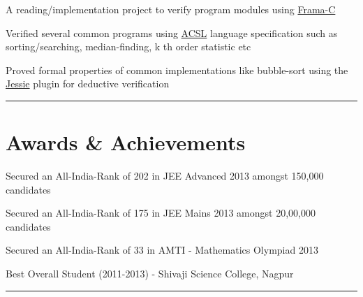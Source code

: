 \documentclass[letterpaper]{Formatting}
\begin{document}
\begin{minipage}[t]{0.66\textwidth}
A reading/implementation project to verify program modules using \href{http://frama-c.com/}{Frama-C}
\vspace{\topsep}
\footnotesize{
\begin{tightitemize}
\item Verified several common programs using \href{frama-c.com/acsl.html}{ACSL} language specification such as sorting/searching, median-finding, k th order statistic etc
\item Proved formal properties of common implementations like bubble-sort using the \href{krakatoa.lri.fr/jessie.pdf}{Jessie} plugin for deductive verification
\end{tightitemize}
}
\sectionspace
\vspace{2ex}
\rule{12cm}{0.5pt}

\vspace{3.9ex}
\section{Awards \& Achievements} 
\vspace{\topsep}
\small{
\begin{tightitemize}
\item Secured an All-India-Rank of 202 in JEE Advanced 2013 amongst 150,000 candidates\\
\item Secured an All-India-Rank of 175 in JEE Mains 2013 amongst 20,00,000 candidates\\
\item Secured an All-India-Rank of 33 in AMTI - Mathematics Olympiad 2013\\
\item Best Overall Student (2011-2013) - Shivaji Science College, Nagpur \\
\end{tightitemize}
}
\sectionspace %
\vspace{2ex}
\rule{12cm}{0.25pt}
\end{minipage} %


\end{document}
